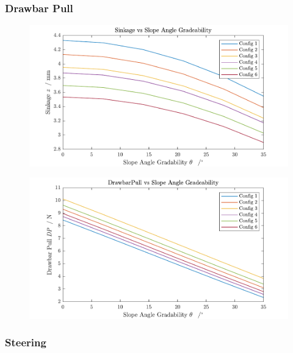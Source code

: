 \subsubsection*{Drawbar Pull}
\label{sec:DP}



\begin{figure}[htb] 
  \centering
     \includegraphics[width=1\textwidth]{Media/Sinkage for each config.pdf}
  \caption{}
  \label{fig:}
\end{figure}

\begin{figure}[htb] 
  \centering
     \includegraphics[width=1\textwidth]{Media/Drawbarpull for each Config.pdf}
  \caption{}
  \label{fig:}
\end{figure}





\subsubsection*{Steering}
\label{sec:Steering}



